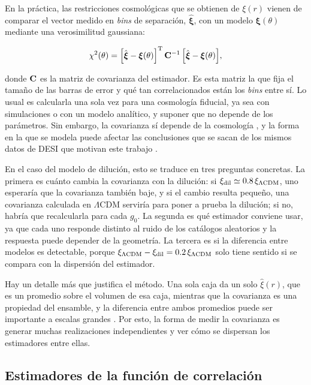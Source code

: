 \documentclass[letterpaper, 12pt]{article}
\newcommand{\LCDM}{\Lambda\mathrm{CDM}}
\begin{document}
            En la práctica, las restricciones cosmológicas que se obtienen de $\xi(r)$ vienen de comparar el vector medido en \emph{bins} de separación, $\hat{\boldsymbol\xi}$, con un modelo $\boldsymbol\xi(\theta)$ mediante una verosimilitud gaussiana:

            \begin{equation}\label{eq:chi2}
                \chi^2(\theta) = \qty[\hat{\boldsymbol\xi} - \boldsymbol\xi(\theta)]^{\rm T}\, \vb{C}^{-1}\, \qty[\hat{\boldsymbol\xi} - \boldsymbol\xi(\theta)],
            \end{equation}

            donde $\vb{C}$ es la matriz de covarianza del estimador. Es esta matriz la que fija el tamaño de las barras de error y qué tan correlacionados están los \emph{bins} entre sí. Lo usual es calcularla una sola vez para una cosmología fiducial, ya sea con simulaciones o con un modelo analítico, y suponer que no depende de los parámetros. Sin embargo, la covarianza sí depende de la cosmología \cite{steele_smith}, y la forma en la que se modela puede afectar las conclusiones que se sacan de los mismos datos de DESI que motivan este trabajo \cite{kolonia}.

            En el caso del modelo de dilución, esto se traduce en tres preguntas concretas. La primera es cuánto cambia la covarianza con la dilución: si $\xi_{\rm dil} \simeq 0.8\,\xi_{\LCDM}$, uno esperaría que la covarianza también baje, y si el cambio resulta pequeño, una covarianza calculada en $\LCDM$ serviría para poner a prueba la dilución; si no, habría que recalcularla para cada $g_0$. La segunda es qué estimador conviene usar, ya que cada uno responde distinto al ruido de los catálogos aleatorios y la respuesta puede depender de la geometría. La tercera es si la diferencia entre modelos es detectable, porque $\xi_{\LCDM} - \xi_{\rm dil} = 0.2\,\xi_{\LCDM}$ solo tiene sentido si se compara con la dispersión del estimador.

            Hay un detalle más que justifica el método. Una sola caja da un solo $\hat\xi(r)$, que es un promedio sobre el volumen de esa caja, mientras que la covarianza es una propiedad del ensamble, y la diferencia entre ambos promedios puede ser importante a escalas grandes \cite{mukherjee}. Por esto, la forma de medir la covarianza es generar muchas realizaciones independientes y ver cómo se dispersan los estimadores entre ellas.

        \subsection{Estimadores de la función de correlación}
\end{document}
